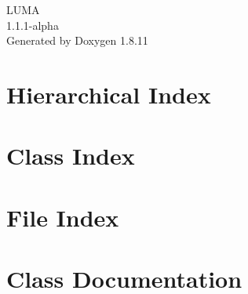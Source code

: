\documentclass[twoside]{book}
\newcommand{\+}{\discretionary{\mbox{\scriptsize$\hookleftarrow$}}{}{}}
\newcommand{\clearemptydoublepage}{%
  \newpage{\pagestyle{empty}\cleardoublepage}%
}
\begin{document}
\hypersetup{pageanchor=false,
             bookmarksnumbered=true,
             pdfencoding=unicode
            }
\begin{titlepage}
\vspace*{7cm}
\begin{center}%
{\Large L\+U\+MA \\[1ex]\large 1.\+1.\+1-\/alpha }\\
\vspace*{1cm}
{\large Generated by Doxygen 1.8.11}\\
\end{center}
\end{titlepage}
\clearemptydoublepage
\tableofcontents
\clearemptydoublepage
{}
\hypersetup{pageanchor=true}

\chapter{Hierarchical Index}

\chapter{Class Index}

\chapter{File Index}

\chapter{Class Documentation}
















\end{document}
